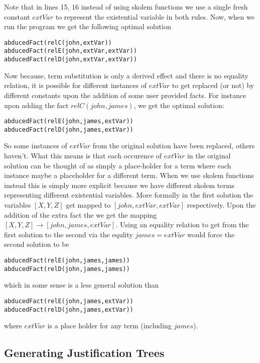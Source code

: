 \documentclass[sigconf]{acmart}
\begin{document}
Note that in lines 15, 16 instead of using skolem functions we use a single
fresh constant $extVar$ to represent the existential variable in both
rules. Now, when we run the program we get the following optimal solution

\begin{verbatim}
abducedFact(relC(john,extVar))
abducedFact(relE(john,extVar,extVar))
abducedFact(relD(john,extVar,extVar))    
\end{verbatim}

Now because, term substitution is only a derived effect and there is no
equality relation, it is possible for different instances of $extVar$ to get
replaced (or not) by different constants upon the addition of some user
provided facts. For instance upon adding the fact $relC(john,james)$, we get
the optimal solution:

\begin{verbatim}
abducedFact(relE(john,james,extVar))
abducedFact(relD(john,james,extVar))    
\end{verbatim}

So some instances of $extVar$ from the original solution have been replaced, others haven't. What this means is that each occurence of $extVar$ in the original solution can be thought of as simply a place-holder for a term where each instance maybe a placeholder for a different term. When we use skolem functions instead this is simply more explicit because we have different skolem terms representing different existential variables. More formally in the first solution the variables $[X,Y,Z]$ get mapped to $[john, extVar,extVar]$ respectively. Upon the addition of the extra fact the we get the mapping $[X,Y,Z]\rightarrow[john,james,extVar]$. Using an equality relation to get from the first solution to the second via the equlity $james = extVar$ would force the second solution to be 

\begin{verbatim}
abducedFact(relE(john,james,james))
abducedFact(relD(john,james,james))    
\end{verbatim}
which in some sense is a less general solution than 
\begin{verbatim}
abducedFact(relE(john,james,extVar))
abducedFact(relD(john,james,extVar))    
\end{verbatim} 
where $extVar$ is a place holder for any term (including $james$).


\subsection{Generating Justification Trees}
\end{document}
